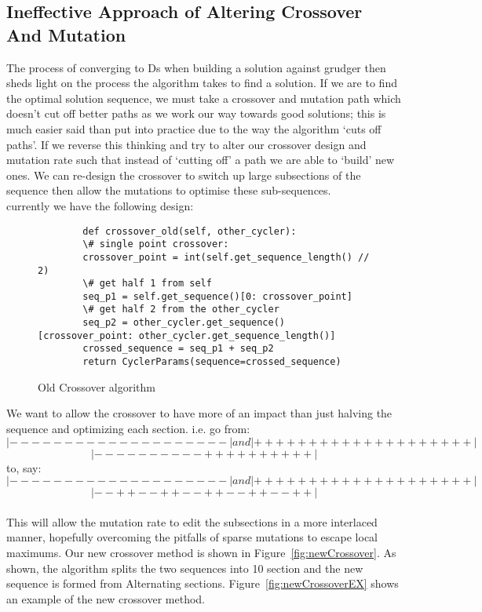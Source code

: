 \subsection{Ineffective Approach of Altering Crossover And Mutation}\label{subsec:ineffectiveApproachOfAlteringCrossoverAndMutation}
The process of converging to Ds when building a solution against grudger then sheds light on the process the algorithm takes to find a solution.
If we are to find the optimal solution sequence, we must take a crossover and mutation path which doesn't cut off better paths as we work our way towards good solutions;
this is much easier said than put into practice due to the way the algorithm `cuts off paths'.
If we reverse this thinking and try to alter our crossover design and mutation rate such that instead of `cutting off' a path we are able to `build' new ones.
We can re-design the crossover to switch up large subsections of the sequence then allow the mutations to optimise these sub-sequences.\\

currently we have the following design:


\begin{figure}
    \begin{verbatim}
        def crossover_old(self, other_cycler):
        \# single point crossover:
        crossover_point = int(self.get_sequence_length() // 2)
        \# get half 1 from self
        seq_p1 = self.get_sequence()[0: crossover_point]
        \# get half 2 from the other_cycler
        seq_p2 = other_cycler.get_sequence()[crossover_point: other_cycler.get_sequence_length()]
        crossed_sequence = seq_p1 + seq_p2
        return CyclerParams(sequence=crossed_sequence)
    \end{verbatim}
    \caption{Old Crossover algorithm}\label{fig:oldCrossover}
\end{figure}

We want to allow the crossover to have more of an impact than just halving the sequence and optimizing each section. i.e. go from:\\
\[|--------------------| and |++++++++++++++++++++|\]
\[|----------++++++++++|\]
to, say:\\
\[|--------------------| and |++++++++++++++++++++|\]
\[ |--++--++--++--++--++|\]\\
This will allow the mutation rate to edit the subsections in a more interlaced manner, hopefully overcoming the pitfalls of sparse mutations to escape local maximums.
Our new crossover method is shown in Figure~\ref{fig:newCrossover}.
As shown, the algorithm splits the two sequences into 10 section and the new sequence is formed from Alternating sections.
Figure~\ref{fig:newCrossoverEX} shows an example of the new crossover method.\\

